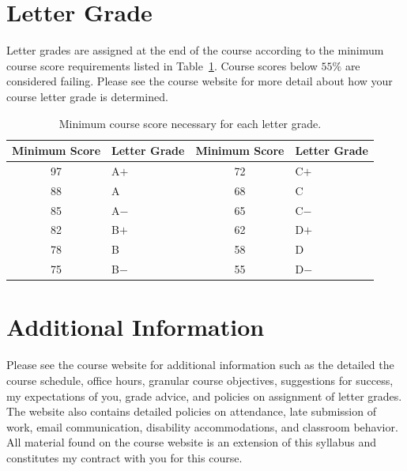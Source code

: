 \documentclass[letterpaper,oneside,onecolumn,11pt,article]{memoir}
\begin{document}
\section{Letter Grade}
Letter grades are assigned at the end of the course according to the minimum course score requirements listed in Table~\ref{tab:lettergrades}. Course scores below $55\%$ are considered failing. Please see the course website for more detail about how your course letter grade is determined. 
\begin{table}[h]
\caption{\sffamily Minimum course score necessary for each letter grade.}
\label{tab:lettergrades}
\begin{tabular}{cl||cl} \toprule
\textbf{Minimum Score} & \textbf{Letter Grade} & \textbf{Minimum Score} & \textbf{Letter Grade} \\ \hline
97 & \hspace{0.3in}A$+$ & 72 & \hspace{0.3in}C$+$ \\
88 & \hspace{0.3in}A & 68 & \hspace{0.3in}C \\
85 & \hspace{0.3in}A$-$ & 65 & \hspace{0.3in}C$-$ \\
82 & \hspace{0.3in}B$+$ & 62 & \hspace{0.3in}D$+$ \\
78 & \hspace{0.3in}B & 58 & \hspace{0.3in}D \\
75 & \hspace{0.3in}B$-$ & 55 & \hspace{0.3in}D$-$ \\
\bottomrule
\end{tabular}
\end{table}
%
%
\section{Additional Information}
Please see the course website for additional information such as the detailed the course schedule, office hours, granular course objectives, suggestions for success, my expectations of you, grade advice, and policies on assignment of letter grades. The website also contains detailed policies on attendance, late submission of work, email communication, disability accommodations, and classroom behavior. All material found on the course website is an extension of this syllabus and constitutes my contract with you for this course. 
%
%
\end{document}
